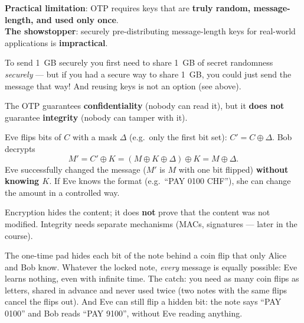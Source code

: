 \begin{defnbox}[title=The key problem of the OTP]
\textbf{Practical limitation}: OTP requires keys that are \textbf{truly random,
message-length, and used only once}. \\
\textbf{The showstopper}: securely pre-distributing message-length keys for real-world
applications is \textbf{impractical}.
\end{defnbox}

\begin{rembox}[title=Why is it a showstopper?]
To send 1~GB securely you first need to share 1~GB of secret randomness \emph{securely}
--- but if you had a secure way to share 1~GB, you could just send the message that way!
And reusing keys is not an option (see above).
\end{rembox}

\begin{defnbox}[title={OTP: integrity is NOT included (malleability)}]
The OTP guarantees \textbf{confidentiality} (nobody can read it), but it \textbf{does
not} guarantee \textbf{integrity} (nobody can tamper with it).
\end{defnbox}

\begin{exbox}[title=Bit-flipping attack]
Eve flips bits of $C$ with a mask $\Delta$ (e.g.\ only the first bit set):
$C' = C \oplus \Delta$. Bob decrypts
\[
  M' = C' \oplus K = (M \oplus K \oplus \Delta) \oplus K = M \oplus \Delta .
\]
Eve successfully changed the message ($M'$ is $M$ with one bit flipped)
\textbf{without knowing $K$}. If Eve knows the format (e.g.\ ``PAY 0100 CHF''), she can
change the amount in a controlled way.
\end{exbox}

\begin{warnbox}[title={Confidentiality $\neq$ integrity}]
Encryption hides the content; it does \textbf{not} prove that the content was not
modified. Integrity needs separate mechanisms (MACs, signatures --- later in the course).
\end{warnbox}

\begin{goatbox}
The one-time pad hides each bit of the note behind a coin flip that only Alice and Bob know.
Whatever the locked note, \emph{every} message is equally possible: Eve learns nothing, even with
infinite time. The catch: you need as many coin flips as letters, shared in advance and never
used twice (two notes with the same flips cancel the flips out). And Eve can still flip a hidden
bit: the note says ``PAY 0100'' and Bob reads ``PAY 9100'', without Eve reading anything.
\end{goatbox}

